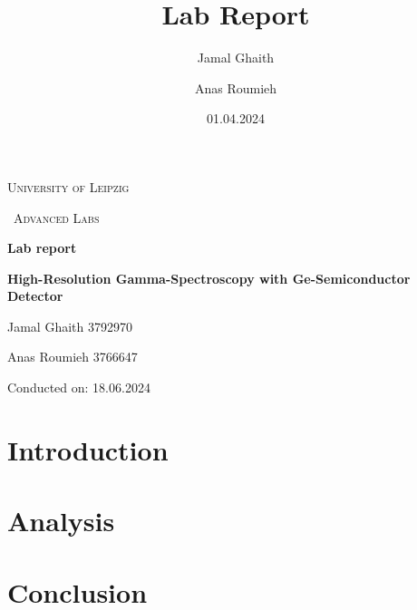 \documentclass{article}
\title{Lab Report}
\author{Jamal Ghaith}
\author{Anas Roumieh}
\date{01.04.2024}
\begin{document}
\begin{titlepage}
	\centering
	{\scshape\LARGE University of Leipzig \par}
	\vspace{1cm}
	{\scshape\ Advanced Labs\par}
	\vspace{1.5cm}
	{\huge\bfseries Lab report\par}
	\vspace{2cm}
	{\huge\bfseries High-Resolution Gamma-Spectroscopy with Ge-Semiconductor Detector\par}
	\vspace{2cm}
	{\Large Jamal Ghaith 3792970\par}
    {\Large Anas Roumieh 3766647\par}
	\vfill

    {\Large Conducted on: 18.06.2024 \par}
	\vfill
\end{titlepage}


\tableofcontents
{}
\pagebreak{}

\section{Introduction}

\section{Analysis}

\section{Conclusion}

\pagebreak{}

\begin{appendices}


\end{appendices}

\pagebreak{}

% 
% 
\end{document}
